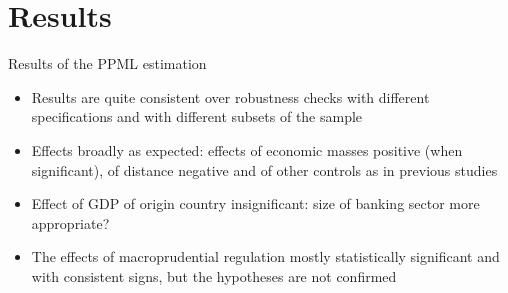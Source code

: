 \documentclass{beamer}
\begin{document}

\section{Results}

\begin{frame}{Results of the PPML estimation}
    \begin{itemize}
        \item Results are quite consistent over robustness checks with different specifications and with different subsets of the sample
        \item Effects broadly as expected: effects of economic masses positive (when significant), of distance negative and of other controls as in previous studies
        \item Effect of GDP of origin country insignificant: size of banking sector more appropriate? 
        \item The effects of macroprudential regulation mostly statistically significant and with consistent signs, but the hypotheses are not confirmed
          \end{itemize}
\end{frame}
\end{document}
